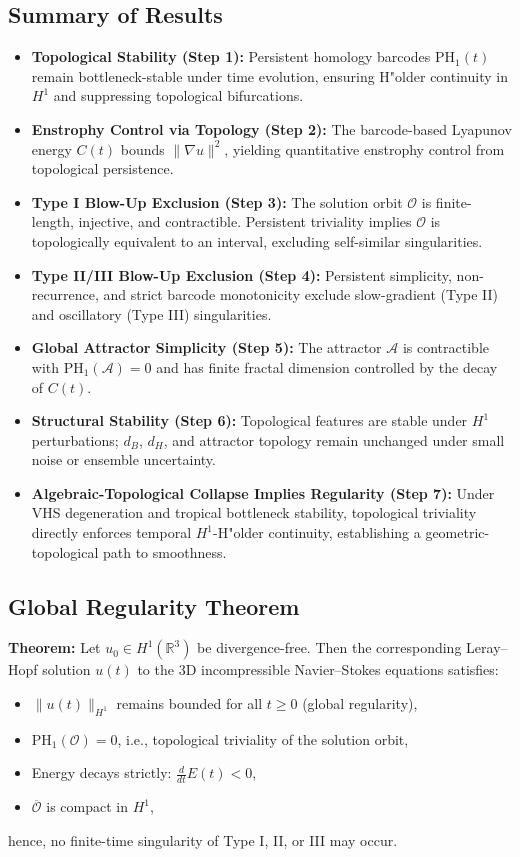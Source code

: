 \documentclass[11pt]{article}
\theoremstyle{definition}
\begin{document}
\subsection*{Summary of Results}
\begin{itemize}
  \item \textbf{Topological Stability (Step 1):} Persistent homology barcodes $\mathrm{PH}_1(t)$ remain bottleneck-stable under time evolution, ensuring H"older continuity in $H^1$ and suppressing topological bifurcations.
  \item \textbf{Enstrophy Control via Topology (Step 2):} The barcode-based Lyapunov energy $C(t)$ bounds $\|\nabla u\|^2$, yielding quantitative enstrophy control from topological persistence.
  \item \textbf{Type I Blow-Up Exclusion (Step 3):} The solution orbit $\mathcal{O}$ is finite-length, injective, and contractible. Persistent triviality implies $\mathcal{O}$ is topologically equivalent to an interval, excluding self-similar singularities.
  \item \textbf{Type II/III Blow-Up Exclusion (Step 4):} Persistent simplicity, non-recurrence, and strict barcode monotonicity exclude slow-gradient (Type II) and oscillatory (Type III) singularities.
  \item \textbf{Global Attractor Simplicity (Step 5):} The attractor $\mathcal{A}$ is contractible with $\mathrm{PH}_1(\mathcal{A}) = 0$ and has finite fractal dimension controlled by the decay of $C(t)$.
  \item \textbf{Structural Stability (Step 6):} Topological features are stable under $H^1$ perturbations; $d_B$, $d_H$, and attractor topology remain unchanged under small noise or ensemble uncertainty.
  \item \textbf{Algebraic-Topological Collapse Implies Regularity (Step 7):} Under VHS degeneration and tropical bottleneck stability, topological triviality directly enforces temporal $H^1$-H"older continuity, establishing a geometric-topological path to smoothness.
\end{itemize}

\subsection*{Global Regularity Theorem}
\textbf{Theorem:} Let $u_0 \in H^1(\mathbb{R}^3)$ be divergence-free. Then the corresponding Leray--Hopf solution $u(t)$ to the 3D incompressible Navier--Stokes equations satisfies:
\begin{itemize}
  \item $\|u(t)\|_{H^1}$ remains bounded for all $t \ge 0$ (global regularity),
  \item $\mathrm{PH}_1(\mathcal{O}) = 0$, i.e., topological triviality of the solution orbit,
  \item Energy decays strictly: $\frac{d}{dt} E(t) < 0$,
  \item $\overline{\mathcal{O}}$ is compact in $H^1$,
\end{itemize}
\noindent hence, no finite-time singularity of Type I, II, or III may occur.
\end{document}
